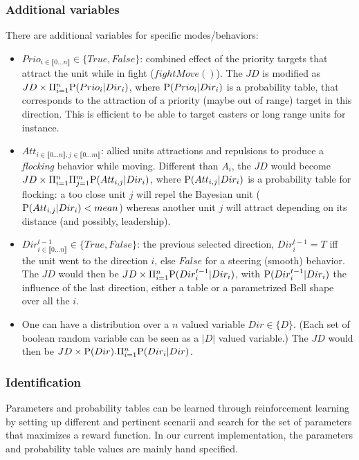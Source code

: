 \subsubsection{Additional variables}
There are additional variables for specific modes/behaviors:
\begin{itemize}
\item $Prio_{i \in \llbracket 0 \dots n\rrbracket } \in \{True, False\}$: combined effect of the priority targets that attract the unit while in fight ($fightMove()$). The $JD$ is modified as $JD \times \Pi_{i=1}^{n} \mathrm{P}(Prio_i | Dir_i)$, where $\mathrm{P}(Prio_i | Dir_i)$ is a probability table, that corresponds to the attraction of a priority (maybe out of range) target in this direction. This is efficient to be able to target casters or long range units for instance.

\item $Att_{i \in \llbracket 0 \dots n\rrbracket, j \in \llbracket 0 \dots m \rrbracket}$: allied units attractions and repulsions to produce a \textit{flocking} behavior while moving. Different than $A_i$, the $JD$ would become $JD \times \Pi_{i=1}^{n} \Pi_{j=1}^{m} \mathrm{P}(Att_{i,j} | Dir_i)$, where $\mathrm{P}(Att_{i,j} | Dir_i)$ is a probability table for flocking: a too close unit $j$ will repel the Bayesian unit ($\mathrm{P}(Att_{i,j} | Dir_i) < mean$) whereas another unit $j$ will attract depending on its distance (and possibly, leadership).

\item $Dir_{i \in \llbracket 0 \dots n\rrbracket }^{t-1} \in \{True, False\}$: the previous selected direction, $Dir_i^{t-1} = T$ iff the unit went to the direction $i$, else $False$ for a steering (smooth) behavior. The $JD$ would then be $JD \times \Pi_{i=1}^{n} \mathrm{P}(Dir_i^{t-1} | Dir_i)$, with $\mathrm{P}(Dir_i^{t-1} | Dir_i)$ the influence of the last direction, either a table or a parametrized Bell shape over all the $i$.

\item One can have a distribution over a $n$ valued variable $Dir \in \{D\}$. (Each set of boolean random variable can be seen as a $|D|$ valued variable.) The $JD$ would then be $JD \times \mathrm{P}(Dir).\Pi_{i=1}^{n} \mathrm{P}(Dir_i | Dir)$.
\end{itemize}

\subsubsection{Identification}

Parameters and probability tables can be learned through reinforcement learning \citep{Sutton,Asmuth09} by setting up different and pertinent scenarii and search for the set of parameters that maximizes a reward function. In our current implementation, the parameters and probability table values are mainly hand specified.

